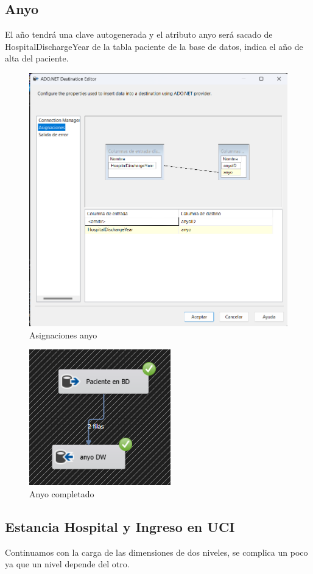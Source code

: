 \documentclass{article}
\begin{document}
	\subsection{Anyo}
	El año tendrá una clave autogenerada y el atributo anyo será sacado de HospitalDischargeYear de la tabla paciente de la base de datos, indica el año de alta del paciente.
	\begin{figure}[H]
		\centering
		\includegraphics[width=.7\linewidth]{./images/asignaciones/anyo.png}
		\caption{Asignaciones anyo}
	\end{figure}
	\begin{figure}[H]
		\centering
		\includegraphics[width=.3\linewidth]{./images/completados/anyo.png}
		\caption{Anyo completado}
	\end{figure}


	\subsection{Estancia Hospital y Ingreso en UCI}
	Continuamos con la carga de las dimensiones de dos niveles, se complica un poco ya que un nivel depende del otro.
\end{document}
